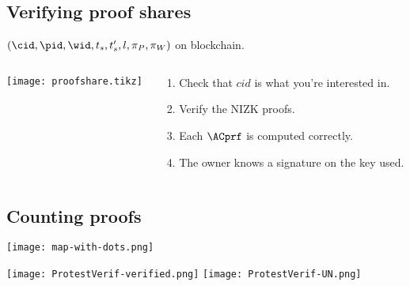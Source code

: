 \subsection{Verifying proof shares}

\begin{frame}
  \vspace{-2em}
  \begin{center}
    \((\cid, \pid, \wid, t_s, t_s', l, \pi_P, \pi_W)\) on blockchain.
  \end{center}

  \pause

  \begin{columns}
    \begin{column}{0.6\linewidth}
      \tiny
      \texttt{[image: proofshare.tikz]}
    \end{column}

    \begin{column}{0.5\linewidth}
      \begin{enumerate}
        \item Check that \(cid\) is what you're interested in.

          \pause

        \item Verify the \ac{NIZK} proofs.

          \pause

        \item Each \(\ACprf\) is computed correctly.
        \item The owner knows a signature on the key used.
      \end{enumerate}
    \end{column}
  \end{columns}
\end{frame}

\subsection{Counting proofs}

\begin{frame}
  \centering
  \texttt{[image: map-with-dots.png]}
\end{frame}

\begin{frame}
  \centering
  \texttt{[image: ProtestVerif-verified.png]}
  \texttt{[image: ProtestVerif-UN.png]}
\end{frame}


